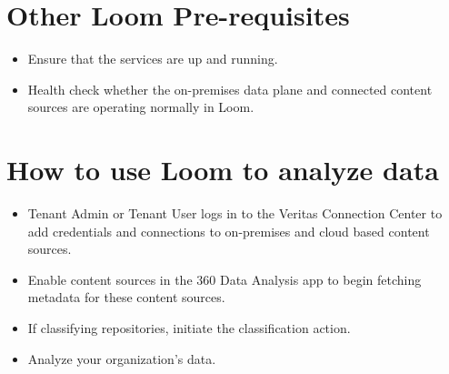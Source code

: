 \documentclass[letterpaper,10pt,english]{sphinxmanual}
\begin{document}
\chapter{Other Loom Pre-requisites}
\label{\detokenize{loom_dep_pre_rq:other-loom-pre-requisites}}\begin{itemize}
\item {} 
Ensure that the services are up and running.

\item {} 
Health check whether the on-premises data plane and connected content sources are operating normally in Loom.

\end{itemize}


\chapter{How to use Loom to analyze data}
\label{\detokenize{loom_dep_pre_rq:how-to-use-loom-to-analyze-data}}\begin{itemize}
\item {} 
Tenant Admin or Tenant User logs in to the Veritas Connection Center to add credentials and connections to on-premises and cloud based content sources.

\item {} 
Enable content sources in the 360 Data Analysis app to begin fetching metadata for these content sources.

\item {} 
If classifying repositories, initiate the classification action.

\item {} 
Analyze your organization’s data.

\end{itemize}



\renewcommand{\indexname}{Index}
\printindex
\end{document}

